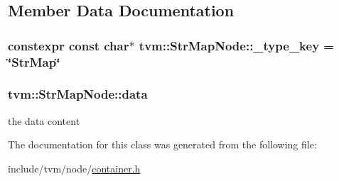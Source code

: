 \subsection{Member Data Documentation}
\subsubsection[{\texorpdfstring{\+\_\+type\+\_\+key}{_type_key}}]{\setlength{\rightskip}{0pt plus 5cm}constexpr const char$\ast$ tvm\+::\+Str\+Map\+Node\+::\+\_\+type\+\_\+key = \char`\"{}Str\+Map\char`\"{}\hspace{0.3cm}{\ttfamily [static]}}\hypertarget{classtvm_1_1StrMapNode_accfa1041faca61e5ef9d77bbf3d73acb}{}\label{classtvm_1_1StrMapNode_accfa1041faca61e5ef9d77bbf3d73acb}
\subsubsection[{\texorpdfstring{data}{data}}]{ tvm\+::\+Str\+Map\+Node\+::data}\hypertarget{classtvm_1_1StrMapNode_a2e0d7690f35ec6f99f850724c81e841f}{}\label{classtvm_1_1StrMapNode_a2e0d7690f35ec6f99f850724c81e841f}


the data content 



The documentation for this class was generated from the following file\+:\begin{DoxyCompactItemize}
\item 
include/tvm/node/\hyperlink{node_2container_8h}{container.\+h}\end{DoxyCompactItemize}
